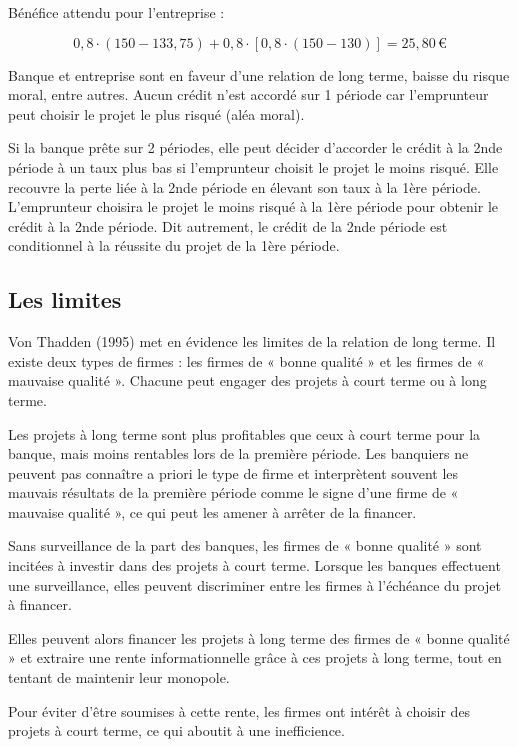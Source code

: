 \documentclass[a4paper, 12pt]{report}
\begin{document}
Bénéfice attendu pour l’entreprise :

\[
0,8 \cdot (150 - 133,75) + 0,8 \cdot [0,8 \cdot (150 - 130)] = 25,80 \, \text{€}
\]

Banque et entreprise sont en faveur d’une relation de long terme, baisse du risque moral, entre autres. Aucun crédit n’est accordé sur 1 période car l’emprunteur peut choisir le projet le plus risqué (aléa moral).

Si la banque prête sur 2 périodes, elle peut décider d’accorder le crédit à la 2nde période à un taux plus bas si l’emprunteur choisit le projet le moins risqué. Elle recouvre la perte liée à la 2nde période en élevant son taux à la 1ère période. L’emprunteur choisira le projet le moins risqué à la 1ère période pour obtenir le crédit à la 2nde période. Dit autrement, le crédit de la 2nde période est conditionnel à la réussite du projet de la 1ère période.

\subsection{Les limites}

Von Thadden (1995) met en évidence les limites de la relation de long terme. Il existe deux types de firmes : les firmes de « bonne qualité » et les firmes de « mauvaise qualité ». Chacune peut engager des projets à court terme ou à long terme.

Les projets à long terme sont plus profitables que ceux à court terme pour la banque, mais moins rentables lors de la première période. Les banquiers ne peuvent pas connaître a priori le type de firme et interprètent souvent les mauvais résultats de la première période comme le signe d’une firme de « mauvaise qualité », ce qui peut les amener à arrêter de la financer.

Sans surveillance de la part des banques, les firmes de « bonne qualité » sont incitées à investir dans des projets à court terme. Lorsque les banques effectuent une surveillance, elles peuvent discriminer entre les firmes à l’échéance du projet à financer. 

Elles peuvent alors financer les projets à long terme des firmes de « bonne qualité » et extraire une rente informationnelle grâce à ces projets à long terme, tout en tentant de maintenir leur monopole. 

Pour éviter d'être soumises à cette rente, les firmes ont intérêt à choisir des projets à court terme, ce qui aboutit à une inefficience.
\end{document}
